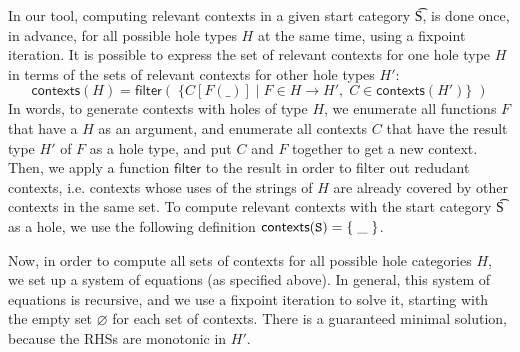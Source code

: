 
\begin{EmptyItem}
\begin{HighlightingFancy}[]
    \OtherTok{::=} 
   \OtherTok{::=} \NormalTok{\{ \}}
   \OtherTok{::=} \NormalTok{\{ \}}
  \OtherTok{::=} \NormalTok{\{ \}}
   \OtherTok{::=} \NormalTok{\{ \}}
  \OtherTok{::=} \NormalTok{\{ \}}
 \OtherTok{::=} \NormalTok{\{ \}}
\end{HighlightingFancy}
\end{EmptyItem}



In our tool, computing relevant contexts in a given start category \t{S}, is done once, in advance, for all possible hole types $H$ at the same time, using a fixpoint iteration. It is possible to express the set of relevant contexts for one hole type $H$ in terms of the sets of relevant contexts for other hole types $H'$:
$$
\textsf{contexts}(H) = \textsf{filter}(\;\{ C[F(\_)] \; | \; F \in H \rightarrow H', \; C \in \textsf{contexts}(H') \}\;)
$$
In words, to generate contexts with holes of type $H$, we enumerate all functions $F$ that have a $H$ as an argument, and enumerate all contexts $C$ that have the result type $H'$ of $F$ as a hole type, and put $C$ and $F$ together to get a new context. Then, we apply a function $\textsf{filter}$ to the result in order to filter out redudant contexts, i.e. contexts whose uses of the strings of $H$ are already covered by other contexts in the same set.
To compute relevant contexts with the start category \t{S} as a hole, we use the following definition $\textsf{contexts}(\texttt{S}) = \{ \; \_ \; \}$.

Now, in order to compute all sets of contexts for all possible hole categories $H$, we set up a system of equations (as specified above). In general, this system of equations is recursive, and we use a fixpoint iteration to solve it, starting with the empty set $\varnothing$ for each set of contexts. There is a guaranteed minimal solution, because the RHSs are monotonic in $H'$.
